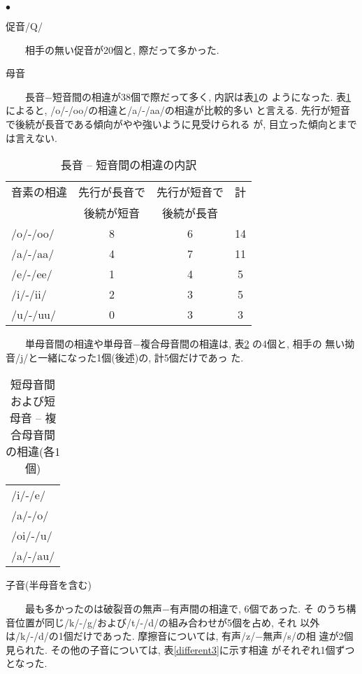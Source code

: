 \begin{list}{\Large $\bullet$}{}
\item 促音/Q/

\ \ \ \ 相手の無い促音が20個と, 際だって多かった. 

\item 母音

\ \ \ \ 長音−短音間の相違が38個で際だって多く, 内訳は表\ref{different1}の
ようになった.  
表\ref{different1}によると, /o/-/oo/の相違と/a/-/aa/の相違が比較的多い
と言える. 先行が短音で後続が長音である傾向がやや強いように見受けられる
が, 目立った傾向とまでは言えない. 

\begin{table}
\begin{center}
\caption{長音 -- 短音間の相違の内訳}\label{different1}
\begin{tabular}{lccc}
音素の相違 & 先行が長音で & 先行が短音で & 計\\
& 後続が短音 & 後続が長音 & \\\hline
/o/-/oo/ & 8 & 6 & 14\\
/a/-/aa/ & 4 & 7 & 11\\
/e/-/ee/ & 1 & 4 & 5\\
/i/-/ii/ & 2 & 3 & 5\\
/u/-/uu/ & 0 & 3 & 3\\
\end{tabular}
\end{center}
\end{table}

\ \ \ \ 単母音間の相違や単母音−複合母音間の相違は, 表\ref{different2}
の4個と, 相手の 無い拗音/j/と一緒になった1個(後述)の, 計5個だけであっ
た. 

\begin{table}
\begin{center}
\caption{短母音間および短母音 -- 複合母音間の相違(各1個)}
\label{different2} 
\begin{tabular}{l}
/i/-/e/\\/a/-/o/\\/oi/-/u/\\/a/-/au/\\
\end{tabular}
\end{center}
\end{table}

\item 子音(半母音を含む)

\ \ \ \ 最も多かったのは破裂音の無声−有声間の相違で, 6個であった. そ
のうち構音位置が同じ/k/-/g/および/t/-/d/の組み合わせが5個を占め, それ
以外は/k/-/d/の1個だけであった. 摩擦音については, 有声/z/−無声/s/の相
違が2個見られた. その他の子音については, 表\ref{different3}に示す相違
がそれぞれ1個ずつとなった. 


\end{list}
